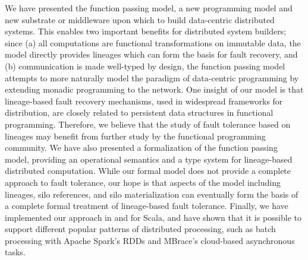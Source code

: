 \documentclass{jfp1}
\begin{document}
We have presented the function passing model, a new programming model and new
substrate or middleware upon which to build data-centric distributed systems.
This enables two important benefits for distributed system builders; since (a)
all computations are functional transformations on immutable data, the model
directly provides lineages which can form the basis for fault recovery, and
(b) communication is made
well-typed by design, the function passing model attempts to more naturally
model the paradigm of data-centric programming by extending monadic programming
to the network. One insight of our model is that lineage-based fault recovery
mechanisms, used in widespread frameworks for distribution, are closely related
to persistent data structures in functional programming. Therefore, we believe
that the study of fault tolerance based on lineages may benefit from further
study by the functional programming community. We have also presented a
formalization of the function passing model, providing an operational
semantics and a type system for lineage-based distributed computation. While
our formal model does not provide a complete approach to fault tolerance,
our hope is that aspects of the model including lineages, silo references, and
silo materialization can eventually form the basis of a complete formal
treatment of lineage-based fault tolerance.
Finally, we have implemented our approach in and for Scala,
and have shown that it is possible to support different popular patterns of
distributed processing, such as  batch processing with Apache Spark's RDDs and
MBrace's cloud-based asynchronous tasks.

\end{document}

